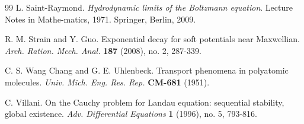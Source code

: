 \documentclass[reqno,11pt]{amsart}
\numberwithin{equation}{section}
\begin{document}
\begin{thebibliography}{99}
 L. Saint-Raymond. {\em Hydrodynamic limits of the Boltzmann equation}. Lecture Notes in Mathe-matics, 1971. Springer, Berlin, 2009. 
    
 R. M. Strain and Y. Guo. Exponential decay for soft potentials near Maxwellian. {\em Arch. Ration. Mech. Anal.} {\bf 187} (2008), no. 2, 287-339.

 C. S. Wang Chang and G. E. Uhlenbeck. Transport phenomena in polyatomic molecules. {\em Univ. Mich. Eng. Res. Rep.} {\bf CM-681} (1951).
    
 C. Villani. On the Cauchy problem for Landau equation: sequential stability, global existence. {\em Adv. Differential Equations} {\bf 1} (1996), no. 5, 793-816. 

\end{thebibliography}
\end{document}

